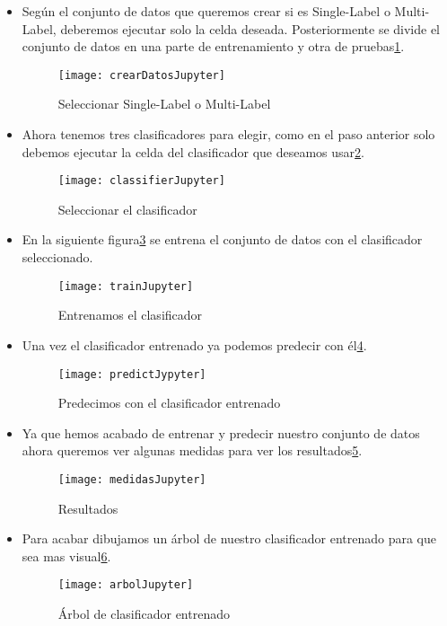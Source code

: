 \begin{itemize}
\begin{itemize}
	\end{itemize}
	\item Según el conjunto de datos que queremos crear si es Single-Label o Multi-Label, deberemos ejecutar solo la celda deseada. Posteriormente se divide el conjunto de datos en una parte de entrenamiento y otra de pruebas\ref{fig:crearDatosJupyter}.
	\begin{figure}
	\centering
	\texttt{[image: crearDatosJupyter]}
	\caption{Seleccionar Single-Label o Multi-Label}
	\label{fig:crearDatosJupyter}
	\end{figure}
  	\item Ahora tenemos tres clasificadores para elegir, como en el paso anterior solo debemos ejecutar la celda del clasificador que deseamos usar\ref{fig:classifierJupyter}.
  	\begin{figure}
	\centering
	\texttt{[image: classifierJupyter]}
	\caption{Seleccionar el clasificador}
	\label{fig:classifierJupyter}
	\end{figure}
	\item En la siguiente figura\ref{fig:trainJupyter} se entrena el conjunto de datos con el clasificador seleccionado.
  	\begin{figure}
	\centering
	\texttt{[image: trainJupyter]}
	\caption{Entrenamos el clasificador}
	\label{fig:trainJupyter}
	\end{figure}
	\item Una vez el clasificador entrenado ya podemos predecir con él\ref{fig:predictJypyter}.
  	\begin{figure}
	\centering
	\texttt{[image: predictJypyter]}
	\caption{Predecimos con el clasificador entrenado}
	\label{fig:predictJypyter}
	\end{figure}
	\item Ya que hemos acabado de entrenar y predecir nuestro conjunto de datos ahora queremos ver algunas medidas para ver los resultados\ref{fig:medidasJupyter}.
  	\begin{figure}
	\centering
	\texttt{[image: medidasJupyter]}
	\caption{Resultados}
	\label{fig:medidasJupyter}
	\end{figure}
	\item Para acabar dibujamos un árbol de nuestro clasificador entrenado para que sea mas visual\ref{fig:arbolJupyter}.
  	\begin{figure}
	\centering
	\texttt{[image: arbolJupyter]}
	\caption{Árbol de clasificador entrenado}
	\label{fig:arbolJupyter}
	\end{figure}
\end{itemize}

